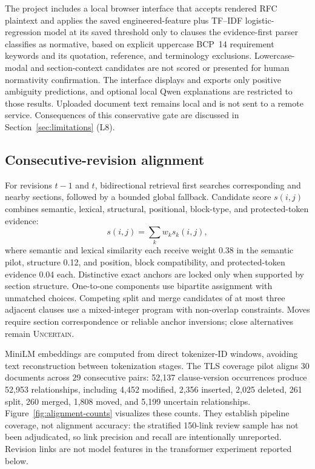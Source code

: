 \documentclass[12pt,a4paper,oneside]{report}
\begin{document}
The project includes a local browser interface that accepts rendered RFC plaintext and applies the saved engineered-feature plus TF--IDF logistic-regression model at its saved threshold only to clauses the evidence-first parser classifies as normative, based on explicit uppercase BCP~14 requirement keywords and its quotation, reference, and terminology exclusions. Lowercase-modal and section-context candidates are not scored or presented for human normativity confirmation. The interface displays and exports only positive ambiguity predictions, and optional local Qwen explanations are restricted to those results. Uploaded document text remains local and is not sent to a remote service. Consequences of this conservative gate are discussed in Section~\ref{sec:limitations} (L8).

\subsection{Consecutive-revision alignment}

For revisions $t-1$ and $t$, bidirectional retrieval first searches corresponding and nearby sections, followed by a bounded global fallback. Candidate score $s(i,j)$ combines semantic, lexical, structural, positional, block-type, and protected-token evidence:
\begin{equation}
s(i,j)=\sum_{k} w_k s_k(i,j),
\end{equation}
where semantic and lexical similarity each receive weight 0.38 in the semantic pilot, structure 0.12, and position, block compatibility, and protected-token evidence 0.04 each. Distinctive exact anchors are locked only when supported by section structure. One-to-one components use bipartite assignment with unmatched choices. Competing split and merge candidates of at most three adjacent clauses use a mixed-integer program with non-overlap constraints. Moves require section correspondence or reliable anchor inversions; close alternatives remain \textsc{Uncertain}.

MiniLM embeddings are computed from direct tokenizer-ID windows, avoiding text reconstruction between tokenization stages. The TLS coverage pilot aligns 30 documents across 29 consecutive pairs: 52,137 clause-version occurrences produce 52,953 relationships, including 4,452 modified, 2,356 inserted, 2,025 deleted, 261 split, 260 merged, 1,808 moved, and 5,199 uncertain relationships. Figure~\ref{fig:alignment-counts} visualizes these counts. They establish pipeline coverage, not alignment accuracy: the stratified 150-link review sample has not been adjudicated, so link precision and recall are intentionally unreported. Revision links are not model features in the transformer experiment reported below.
\end{document}
